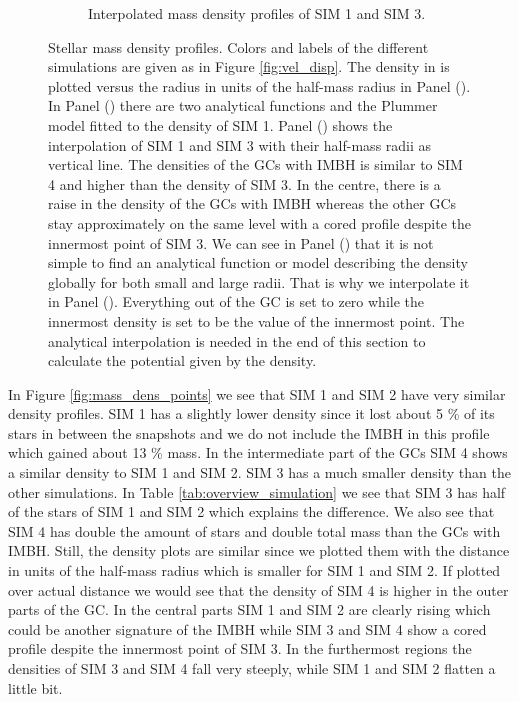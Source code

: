 \begin{figure}[htbp]
\begin{subfigure}{0.475\textwidth}
		\caption{Interpolated mass density profiles of SIM 1 and SIM 3.}
		\label{fig:mass_dens_intpol}
	\end{subfigure}
	\caption{Stellar mass density profiles. Colors and labels of the different simulations are given as in Figure \ref{fig:vel_disp}. The density in  is plotted versus the radius in units of the half-mass radius in Panel (). In Panel () there are two analytical functions and the Plummer model fitted to the density of SIM 1. Panel () shows the interpolation of SIM 1 and SIM 3 with their half-mass radii as vertical line. The densities of the \acp{GC} with \ac{IMBH} is similar to SIM 4 and higher than the density of SIM 3. In the centre, there is a raise in the density of the \acp{GC} with \ac{IMBH} whereas the other \acp{GC} stay approximately on the same level with a cored profile despite the innermost point of SIM 3. We can see in Panel () that it is not simple to find an analytical function or model describing the density globally for both small and large radii. That is why we interpolate it in Panel (). Everything out of the \ac{GC} is set to zero while the innermost density is set to be the value of the innermost point. The analytical interpolation is needed in the end of this section to calculate the potential given by the density.}
	\label{fig:mass_density_profile}
\end{figure}
In Figure \ref{fig:mass_dens_points} we see that SIM 1 and SIM 2 have very similar density profiles. SIM 1 has a slightly lower density since it lost about 5 \% of its stars in between the snapshots and we do not include the \ac{IMBH} in this profile which gained about 13 \% mass. In the intermediate part of the \acp{GC} SIM 4 shows a similar density to SIM 1 and SIM 2. SIM 3 has a much smaller density than the other simulations. In Table \ref{tab:overview_simulation} we see that SIM 3 has half of the stars of SIM 1 and SIM 2 which explains the difference. We also see that SIM 4 has double the amount of stars and double total mass than the \acp{GC} with \ac{IMBH}. Still, the density plots are similar since we plotted them with the distance in units of the half-mass radius which is smaller for SIM 1 and SIM 2. If plotted over actual distance we would see that the density of SIM 4 is higher in the outer parts of the \ac{GC}. In the central parts SIM 1 and SIM 2 are clearly rising which could be another signature of the \ac{IMBH} while SIM 3 and SIM 4 show a cored profile despite the innermost point of SIM 3. In the furthermost regions the densities of SIM 3 and SIM 4 fall very steeply, while SIM 1 and SIM 2 flatten a little bit.
